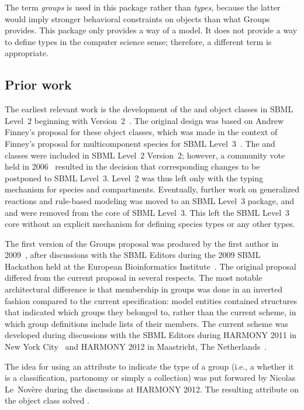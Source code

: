 The term \emph{groups} is used in this package rather than \emph{types}, because the latter would imply stronger behavioral constraints on objects than what Groups provides. This package only provides a way of  a model.  It does not provide a way to define types in the computer science sense; therefore, a different term is appropriate.


\subsection{Prior work}

The earliest relevant work is the development of the \CompartmentType and \SpeciesType object classes in SBML Level~2 beginning with Version~2~\citep{l2v2}. The original design was based on Andrew Finney's proposal for these object classes, which was made in the context of Finney's proposal for multicomponent species for SBML Level~3~\citep{finney_2004}.  The \SpeciesType and \CompartmentType classes were included in SBML Level~2 Version~2; however, a community vote held in 2006~\citep{vote_2006b} resulted in the decision that corresponding changes to \Reaction be postponed to SBML Level~3.  Level~2 was thus left only with the typing mechanism for species and compartments.  Eventually, further work on generalized reactions and rule-based modeling was moved to an SBML Level~3 package, and \SpeciesType and \CompartmentType were removed from the core of SBML Level~3.  This left the SBML Level~3 core without an explicit mechanism for defining species types or any other types.

The first version of the Groups proposal was produced by the first author in 2009~\citep{hucka_2009}, after discussions with the SBML Editors during the 2009 SBML Hackathon held at the European Bioinformatics Institute~\citep{sbml_hackathon_2009}.  The original proposal differed from the current proposal in several respects. The most notable architectural difference is that membership in groups was done in an inverted fashion compared to the current specification: model entities contained structures that indicated which groups they belonged to, rather than the current scheme, in which group definitions include lists of their members.  The current scheme was developed during discussions with the SBML Editors during HARMONY 2011 in New York City~\citep{harmony_2011} and HARMONY 2012 in Maastricht, The Netherlands~\citep{harmony_2012}.

The idea for using an attribute to indicate the type of a group (i.e., a whether it is a classification, partonomy or simply a collection) was put forwared by Nicolas Le~Nov\`{e}re during the discussions at HARMONY 2012.  The resulting attribute  on the \Group object class solved .

